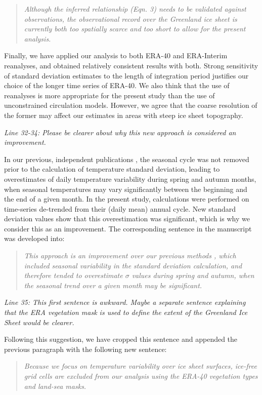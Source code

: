 \documentclass[10pt]{article}
\def\referee#1{\bigskip\textcolor{blue!50!black}{\textit{#1}}}
\def\msquote#1{\begin{quote}\textit{#1}\end{quote}}
\begin{document}
\msquote{Although the inferred relationship (Eqn. 3) needs to be validated against observations, the observational record over the Greenland ice sheet is currently both too spatially scarce and too short to allow for the present analysis.}

Finally, we have applied our analysis to both ERA-40 and ERA-Interim reanalyses, and obtained relatively consistent results with both. Strong sensitivity of standard deviation estimates to the length of integration period \citep{rogozhina-rau-2014} justifies our choice of the longer time series of ERA-40. We also think that the use of reanalyses is more appropriate for the present study than the use of unconstrained circulation models. However, we agree that the coarse resolution of the former may affect our estimates in areas with steep ice sheet topography.

\referee{Line 32-34: Please be clearer about why this new approach is considered an improvement.}

In our previous, independent publications \citep{seguinot-2013,rogozhina-rau-2014}, the seasonal cycle was not removed prior to the calculation of temperature standard deviation, leading to overestimates of daily temperature variability during spring and autumn months, when seasonal temperatures may vary significantly between the beginning and the end of a given month. In the present study, calculations were performed on time-series de-trended from their (daily mean) annual cycle. New standard deviation values show that this overestimation was significant, which is why we consider this as an improvement. The corresponding sentence in the manuscript was developed into:

\msquote{This approach is an improvement over our previous methods \citep{seguinot-2013,rogozhina-rau-2014}, which included seasonal variability in the standard deviation calculation, and therefore tended to overestimate $\sigma$ values during spring and autumn, when the seasonal trend over a given month may be significant.}

\referee{Line 35: This first sentence is awkward. Maybe a separate sentence explaining that the ERA vegetation mask is used to define the extent of the Greenland Ice Sheet would be clearer.}

Following this suggestion, we have cropped this sentence and appended the previous paragraph with the following new sentence:

\msquote{Because we focus on temperature variability over ice sheet surfaces, ice-free grid cells are excluded from our analysis using the ERA-40 vegetation types and land-sea masks.}
\end{document}
